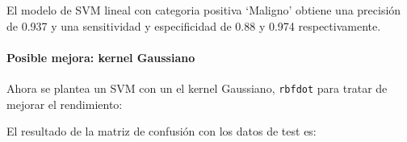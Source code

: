 \documentclass[
]{article}
\newenvironment{Shaded}{\begin{snugshade}}{\end{snugshade}}
\newcommand{\CommentTok}[1]{\textcolor[rgb]{0.56,0.35,0.01}{\textit{#1}}}
\newcommand{\DataTypeTok}[1]{\textcolor[rgb]{0.13,0.29,0.53}{#1}}
\newcommand{\KeywordTok}[1]{\textcolor[rgb]{0.13,0.29,0.53}{\textbf{#1}}}
\newcommand{\NormalTok}[1]{#1}
\newcommand{\OperatorTok}[1]{\textcolor[rgb]{0.81,0.36,0.00}{\textbf{#1}}}
\newcommand{\StringTok}[1]{\textcolor[rgb]{0.31,0.60,0.02}{#1}}
\let\oldparagraph\paragraph
\renewcommand{\paragraph}[1]{\oldparagraph{#1}\mbox{}}
\begin{document}
El modelo de SVM lineal con categoria positiva `Maligno' obtiene una
precisión de 0.937 y una sensitividad y especificidad de 0.88 y 0.974
respectivamente.

\hypertarget{posible-mejora-kernel-gaussiano}{%
\paragraph{Posible mejora: kernel
Gaussiano}\label{posible-mejora-kernel-gaussiano}}

Ahora se plantea un SVM con un el kernel Gaussiano, \texttt{rbfdot} para
tratar de mejorar el rendimiento:

\begin{Shaded}
\end{Shaded}

El resultado de la matriz de confusión con los datos de test es:

\begin{Shaded}
\end{Shaded}
\end{document}
